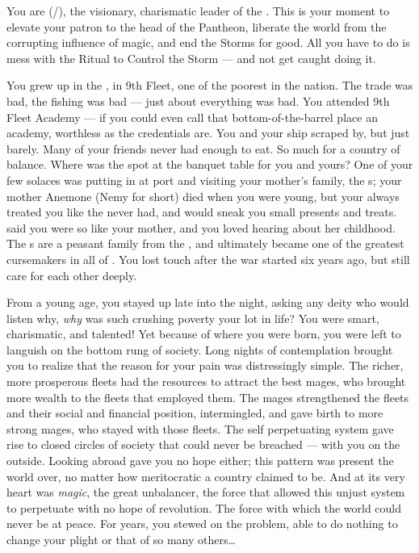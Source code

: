 \documentclass[char]{GL2020}
\begin{document}
\name{\cChupLeader{}}

You are \cChupLeader{\full} (\cChupLeader{\they}/\cChupLeader{\them}), the visionary, charismatic leader of the \pGoaties{}. This is your moment to elevate your patron \cGenesis{\Deity} \cGenesis{} to the head of the Pantheon, liberate the world from the corrupting influence of magic, and end the Storms for good. All you have to do is mess with the Ritual to Control the Storm — and not get caught doing it.

You grew up in the \pShip{}, in 9th Fleet, one of the poorest in the nation. The trade was bad, the fishing was bad — just about everything was bad. You attended 9th Fleet Academy — if you could even call that bottom-of-the-barrel place an academy, worthless as the credentials are. You and your ship scraped by, but just barely. Many of your friends never had enough to eat. So much for a country of balance. Where was the spot at the banquet table for you and yours? One of your few solaces was putting in at port and visiting your mother’s family, the \cCurse{\formal}s; your mother Anemone (Nemy for short) died when you were young, but your \cCurse{\auncle} \cCurse{\full} always treated you like the \cChupLeader{\offspring} \cCurse{\they} never had, and would sneak you small presents and treats. \cCurse{\They} said you were so like your mother, and you loved hearing about her childhood. The \cCurse{\formal}s are a peasant family from the \pFarm{}, and \cCurse{} ultimately became one of the greatest cursemakers in all of \pEarth{}. You lost touch after the war started six years ago, but still care for each other deeply.

From a young age, you stayed up late into the night, asking any deity who would listen why, \emph{why} was such crushing poverty your lot in life? You were smart, charismatic, and talented! Yet because of where you were born, you were left to languish on the bottom rung of society. Long nights of contemplation brought you to realize that the reason for your pain was distressingly simple. The richer, more prosperous fleets had the resources to attract the best mages, who brought more wealth to the fleets that employed them. The mages strengthened the fleets and their social and financial position, intermingled, and gave birth to more strong mages, who stayed with those fleets. The self perpetuating system gave rise to closed circles of society that could never be breached — with you on the outside. Looking abroad gave you no hope either; this pattern was present the world over, no matter how meritocratic a country claimed to be. And at its very heart was \emph{magic}, the great unbalancer, the force that allowed this unjust system to perpetuate with no hope of revolution. The force with which the world could never be at peace. For years, you stewed on the problem, able to do nothing to change your plight or that of so many others\ldots{}
\end{document}
